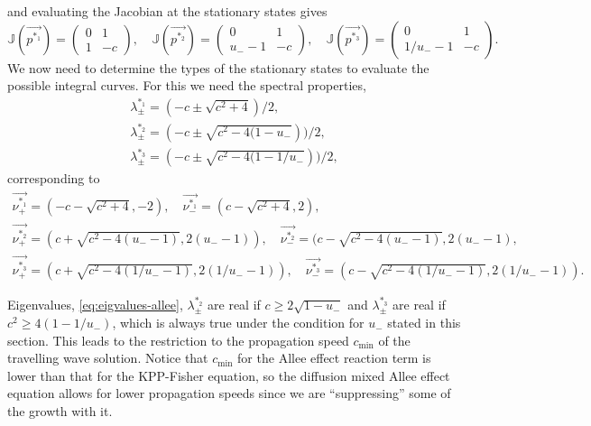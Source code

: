    and evaluating the Jacobian at the stationary states gives \begin{equation}
       \mathbb{J}(\vec{p^{*_1}}) = \begin{pmatrix}
           0 & 1 \\
           1 & -c
       \end{pmatrix}, \quad \mathbb{J}(\vec{p^{*_2}}) = \begin{pmatrix}
           0 & 1 \\
           u_{-} - 1 & -c
       \end{pmatrix},\quad \mathbb{J}(\vec{p^{*_3}}) = \begin{pmatrix}
            0 & 1 \\
            1/u_{-} - 1 & -c
       \end{pmatrix}.
    \end{equation}
We now need to determine the types of the stationary states to evaluate the possible integral curves.
For this we need the spectral properties, \begin{equation}
    \label{eq:eigvalues-allee}
   \begin{gathered}
        \lambda^{*_1}_{\pm} = (-c \pm \sqrt{c^2 + 4})/2, \\
        \lambda^{*_2}_{\pm} = (-c \pm \sqrt{c^2 - 4(1 - u_{-}}))/2, \\
        \lambda^{*_3}_{\pm} = (-c \pm \sqrt{c^2 - 4(1 - 1/u_{-}}))/2, 
    \end{gathered}
\end{equation}
    corresponding to \begin{equation} 
        \begin{gathered}
            \vec{\nu^{*_1}_{+}} = (-c - \sqrt{c^2 + 4}, -2), \quad \vec{\nu^{*_1}_{-}} = (c - \sqrt{c^2 + 4},2), \\
            \vec{\nu^{*_2}_{+}} = (c + \sqrt{c^2 - 4(u_{-}-1)}, 2(u_{-} - 1)), \quad \vec{\nu^{*_2}_{-}} = (c
            - \sqrt{c^2 - 4(u_{-} - 1)}, 2(u_{-} - 1), \\
            \vec{\nu^{*_3}_{+}} = (c + \sqrt{c^2 - 4(1/u_{-} - 1)}, 2(1/u_{-} - 1)), \quad \vec{\nu^{*_3}_{-}} = (c - \sqrt{c^2 - 4(1/u_{-} - 1)}, 2(1/u_{-} - 1)).
        \end{gathered}
    \end{equation}    

Eigenvalues, \cref{eq:eigvalues-allee}, \(\lambda^{*_2}_{\pm}\) are real if \(c \ge 2 \sqrt{1 - u_{-}}\) and 
        \(\lambda^{*_3}_{\pm}\) are real if \(c^2 \ge 4(1 - 1/u_{-})\), which is always true under the condition for 
        \(u_{-}\) stated in this section.
This leads to the restriction to the propagation speed \(c_{\text{min}}\) of the travelling wave solution.
Notice that \(c_{\text{min}}\) for the Allee effect reaction term is lower than that for the \ac{KPP}-Fisher equation,
    so the diffusion mixed Allee effect equation allows for lower propagation speeds since we are ``suppressing'' some 
    of the growth with it.

